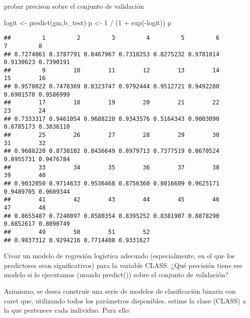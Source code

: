 \documentclass[
]{article}
\newenvironment{Shaded}{\begin{snugshade}}{\end{snugshade}}
\newcommand{\AttributeTok}[1]{\textcolor[rgb]{0.77,0.63,0.00}{#1}}
\newcommand{\CommentTok}[1]{\textcolor[rgb]{0.56,0.35,0.01}{\textit{#1}}}
\newcommand{\DecValTok}[1]{\textcolor[rgb]{0.00,0.00,0.81}{#1}}
\newcommand{\FunctionTok}[1]{\textcolor[rgb]{0.00,0.00,0.00}{#1}}
\newcommand{\NormalTok}[1]{#1}
\newcommand{\OtherTok}[1]{\textcolor[rgb]{0.56,0.35,0.01}{#1}}
\newcommand{\SpecialCharTok}[1]{\textcolor[rgb]{0.00,0.00,0.00}{#1}}
\newcommand{\StringTok}[1]{\textcolor[rgb]{0.31,0.60,0.02}{#1}}
\begin{document}
probar precison sobre el conjunto de validación

\begin{Shaded}
\begin{Highlighting}[]
\NormalTok{logit }\OtherTok{\textless{}{-}} \FunctionTok{predict}\NormalTok{(gm,b\_test)}
\NormalTok{p }\OtherTok{\textless{}{-}} \DecValTok{1} \SpecialCharTok{/}\NormalTok{ (}\DecValTok{1} \SpecialCharTok{+} \FunctionTok{exp}\NormalTok{(}\SpecialCharTok{{-}}\NormalTok{logit))}
\NormalTok{p}
\end{Highlighting}
\end{Shaded}

\begin{verbatim}
##         1         2         3         4         5         6         7         8 
## 0.7274061 0.3787791 0.8467967 0.7318253 0.8275232 0.9781014 0.9130623 0.7390191 
##         9        10        11        12        13        14        15        16 
## 0.9578022 0.7478369 0.8323747 0.9792444 0.9512721 0.9492280 0.6901570 0.9586999 
##        17        18        19        20        21        22        23        24 
## 0.7333317 0.9461054 0.9688220 0.9343576 0.5164343 0.9003090 0.8785173 0.3836110 
##        25        26        27        28        29        30        31        32 
## 0.9688220 0.8738102 0.8436649 0.8979713 0.7377519 0.8670524 0.8955731 0.9476784 
##        33        34        35        36        37        38        39        40 
## 0.9032050 0.9714633 0.9536468 0.8756360 0.8016609 0.9625171 0.9489705 0.9609344 
##        41        42        43        44        45        46        47        48 
## 0.8655487 0.7240897 0.8580354 0.8395252 0.8381907 0.8878290 0.8852617 0.8090749 
##        49        50        51        52 
## 0.9837312 0.9294216 0.7714408 0.9331627
\end{verbatim}

Crear un modelo de regresión logística adecuado (especialmente, en el
que los predictores sean significativos) para la variable CLASS. ¿Qué
precisión tiene ese modelo si lo ejecutamos (usando predict()) sobre el
conjunto de validación?

Asimismo, se desea construir una serie de modelos de clasificación
binaria con caret que, utilizando todos los parámetros disponibles,
estime la clase (CLASS) a la que pertenece cada individuo. Para ello:

\begin{Shaded}
\end{Shaded}
\end{document}
